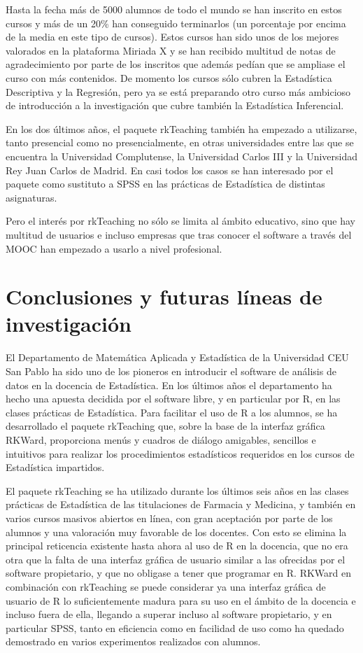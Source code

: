 \documentclass[a4paper,10pt,twoside]{article}
\newcommand{\rkteaching}{\textsf{rkTeaching}}
\newcommand{\rkward}{\textsf{RKWard}}
\newcommand{\spss}{\textsf{SPSS}}
\begin{document}
Hasta la fecha más de 5000 alumnos de todo el mundo se han inscrito en estos cursos y más de un 20\% han conseguido
terminarlos (un porcentaje por encima de la media en este tipo de cursos).
Estos cursos han sido unos de los mejores valorados en la plataforma Miriada X y se han recibido multitud de notas de
agradecimiento por parte de los inscritos que además pedían que se ampliase el curso con más contenidos. 
De momento los cursos sólo cubren la Estadística Descriptiva y la Regresión, pero ya se está preparando otro curso más
ambicioso de introducción a la investigación que cubre también la Estadística Inferencial. 

En los dos últimos años, el paquete \rkteaching{} también ha empezado a utilizarse, tanto presencial como no
presencialmente, en otras universidades entre las que se encuentra la Universidad Complutense, la Universidad Carlos III
y la Universidad Rey Juan Carlos de Madrid.
En casi todos los casos se han interesado por el paquete como sustituto a \spss{} en las prácticas de Estadística de
distintas asignaturas.

Pero el interés por \rkteaching{} no sólo se limita al ámbito educativo, sino que hay multitud de usuarios e incluso
empresas que tras conocer el software a través del MOOC han empezado a usarlo a nivel profesional. 


\section{Conclusiones y futuras líneas de investigación}
\label{s:conclusiones}
El Departamento de Matemática Aplicada y Estadística de la Universidad CEU San Pablo ha sido uno de los pioneros en
introducir el software de análisis de datos en la docencia de Estadística. 
En los últimos años el departamento ha hecho una apuesta decidida por el software libre, y en particular por R, en las
clases prácticas de Estadística. 
Para facilitar el uso de R a los alumnos, se ha desarrollado el paquete \rkteaching{} que, sobre la base de la interfaz
gráfica \rkward{}, proporciona menús y cuadros de diálogo amigables, sencillos e intuitivos para realizar los
procedimientos estadísticos requeridos en los cursos de Estadística impartidos. 

El paquete \rkteaching{} se ha utilizado durante los últimos seis años en las clases prácticas de Estadística de las
titulaciones de Farmacia y Medicina, y también en varios cursos masivos abiertos en línea, con gran aceptación por parte
de los alumnos y una valoración muy favorable de los docentes.
Con esto se elimina la principal reticencia existente hasta ahora al uso de R en la docencia, que no era otra que la
falta de una interfaz gráfica de usuario similar a las ofrecidas por el software propietario, y que no obligase a tener
que programar en R.
\rkward{} en combinación con \rkteaching{} se puede considerar ya una interfaz gráfica de usuario de R lo
suficientemente madura para su uso en el ámbito de la docencia e incluso fuera de ella, llegando a superar incluso al
software propietario, y en particular \spss{}, tanto en eficiencia como en facilidad de uso como ha quedado
demostrado en varios experimentos realizados con alumnos. 
\end{document}

